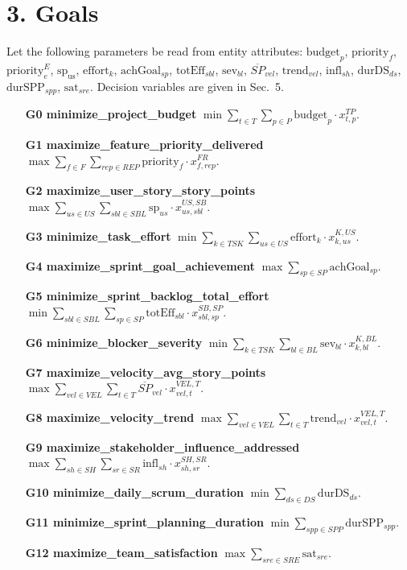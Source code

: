 \documentclass[11pt,a4paper]{article}
\begin{document}
\section{3. Goals}
Let the following parameters be read from entity attributes: 
$\text{budget}_p$, $\text{priority}_f$, $\text{priority}^E_e$, $\text{sp}_\text{us}$, $\text{effort}_k$, $\text{achGoal}_{sp}$, $\text{totEff}_{sbl}$, $\text{sev}_{bl}$, $\overline{SP}_{vel}$, $\text{trend}_{vel}$, $\text{infl}_{sh}$, $\text{durDS}_{ds}$, $\text{durSPP}_{spp}$, $\text{sat}_{sre}$.
Decision variables are given in Sec.~5.

\begin{itemize}
  \item[\textbf{G0 minimize\_project\_budget}] $\displaystyle \min \sum_{t\in T}\sum_{p\in P} \text{budget}_p \cdot x^{TP}_{t,p}$.
  \item[\textbf{G1 maximize\_feature\_priority\_delivered}] $\displaystyle \max \sum_{f\in F}\sum_{rep\in REP} \text{priority}_f \cdot x^{FR}_{f,rep}$.
  \item[\textbf{G2 maximize\_user\_story\_story\_points}] $\displaystyle \max \sum_{us\in US}\sum_{sbl\in SBL} \text{sp}_{us} \cdot x^{US,SB}_{us,sbl}$.
  \item[\textbf{G3 minimize\_task\_effort}] $\displaystyle \min \sum_{k\in TSK}\sum_{us\in US} \text{effort}_k \cdot x^{K,US}_{k,us}$.
  \item[\textbf{G4 maximize\_sprint\_goal\_achievement}] $\displaystyle \max \sum_{sp\in SP} \text{achGoal}_{sp}$.
  \item[\textbf{G5 minimize\_sprint\_backlog\_total\_effort}] $\displaystyle \min \sum_{sbl\in SBL}\sum_{sp\in SP} \text{totEff}_{sbl}\cdot x^{SB,SP}_{sbl,sp}$.
  \item[\textbf{G6 minimize\_blocker\_severity}] $\displaystyle \min \sum_{k\in TSK}\sum_{bl\in BL} \text{sev}_{bl}\cdot x^{K,BL}_{k,bl}$.
  \item[\textbf{G7 maximize\_velocity\_avg\_story\_points}] $\displaystyle \max \sum_{vel\in VEL}\sum_{t\in T} \overline{SP}_{vel}\cdot x^{VEL,T}_{vel,t}$.
  \item[\textbf{G8 maximize\_velocity\_trend}] $\displaystyle \max \sum_{vel\in VEL}\sum_{t\in T} \text{trend}_{vel}\cdot x^{VEL,T}_{vel,t}$.
  \item[\textbf{G9 maximize\_stakeholder\_influence\_addressed}] $\displaystyle \max \sum_{sh\in SH}\sum_{sr\in SR} \text{infl}_{sh}\cdot x^{SH,SR}_{sh,sr}$.
  \item[\textbf{G10 minimize\_daily\_scrum\_duration}] $\displaystyle \min \sum_{ds\in DS} \text{durDS}_{ds}$.
  \item[\textbf{G11 minimize\_sprint\_planning\_duration}] $\displaystyle \min \sum_{spp\in SPP} \text{durSPP}_{spp}$.
  \item[\textbf{G12 maximize\_team\_satisfaction}] $\displaystyle \max \sum_{sre\in SRE} \text{sat}_{sre}$.
\end{itemize}
\end{document}
